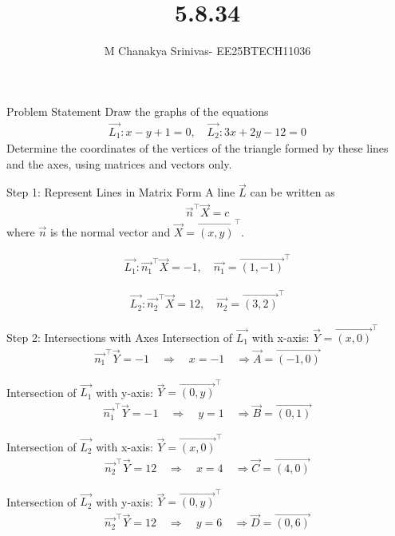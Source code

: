 \documentclass{beamer}
\title %
{5.8.34}
\date{}
\author %
{M Chanakya Srinivas- EE25BTECH11036}
\begin{document}
\frame{\titlepage}


\begin{frame}{Problem Statement}
Draw the graphs of the equations
\begin{align}
\vec{L_1}: x - y + 1 = 0, \quad 
\vec{L_2}: 3x + 2y - 12 = 0
\end{align}
Determine the coordinates of the vertices of the triangle formed by these lines and the axes, using matrices and vectors only.
\end{frame}

\begin{frame}{Step 1: Represent Lines in Matrix Form}
A line $\vec{L}$ can be written as
\begin{align}
\vec{n}^\top \vec{X} = c
\end{align}
where $\vec{n}$ is the normal vector and $\vec{X} = \vec{(x,y)}^\top$.

\begin{align}
\vec{L_1}: \vec{n_1}^\top \vec{X} = -1, \quad \vec{n_1} = \vec{(1,-1)}^\top
\end{align}

\begin{align}
\vec{L_2}: \vec{n_2}^\top \vec{X} = 12, \quad \vec{n_2} = \vec{(3,2)}^\top
\end{align}
\end{frame}

\begin{frame}{Step 2: Intersections with Axes}
Intersection of $\vec{L_1}$ with x-axis: $\vec{Y} = \vec{(x,0)}^\top$
\begin{align}
\vec{n_1}^\top \vec{Y} = -1 \quad \Rightarrow \quad x = -1 \quad \Rightarrow \vec{A} = \vec{(-1,0)}
\end{align}

Intersection of $\vec{L_1}$ with y-axis: $\vec{Y} = \vec{(0,y)}^\top$
\begin{align}
\vec{n_1}^\top \vec{Y} = -1 \quad \Rightarrow \quad y = 1 \quad \Rightarrow \vec{B} = \vec{(0,1)}
\end{align}

Intersection of $\vec{L_2}$ with x-axis: $\vec{Y} = \vec{(x,0)}^\top$
\begin{align}
\vec{n_2}^\top \vec{Y} = 12 \quad \Rightarrow \quad x = 4 \quad \Rightarrow \vec{C} = \vec{(4,0)}
\end{align}

Intersection of $\vec{L_2}$ with y-axis: $\vec{Y} = \vec{(0,y)}^\top$
\begin{align}
\vec{n_2}^\top \vec{Y} = 12 \quad \Rightarrow \quad y = 6 \quad \Rightarrow \vec{D} = \vec{(0,6)}
\end{align}
\end{frame}
\end{document}
